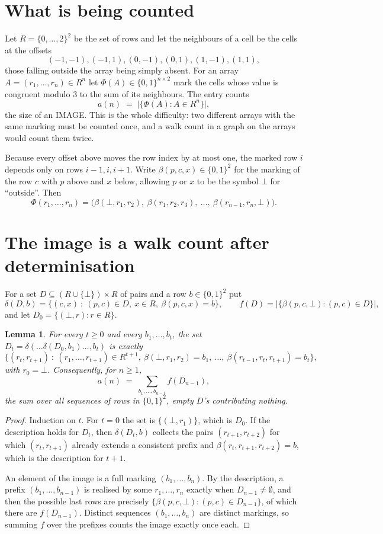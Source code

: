\documentclass[11pt,a4paper]{article}
\theoremstyle{plain}
\newtheorem{lemma}[theorem]{Lemma}
\theoremstyle{definition}
\begin{document}
\section{What is being counted}

Let $R=\{0,\dots,2\}^{2}$ be the set of rows and let the neighbours of a cell be the
cells at the offsets
\[
(-1,-1), (-1,1), (0,-1), (0,1), (1,-1), (1,1),
\]
those falling outside the array being simply absent. For an array
$A=(r_1,\dots,r_n)\in R^n$ let $\Phi(A)\in\{0,1\}^{n\times2}$ mark the cells whose value
is congruent modulo 3 to the sum of its neighbours. The entry counts
\[
a(n)\;=\;\bigl|\{\Phi(A):A\in R^n\}\bigr| ,
\]
the size of an IMAGE. This is the whole difficulty: two different arrays with the same marking
must be counted once, and a walk count in a graph on the arrays would count them twice.

Because every offset above moves the row index by at most one, the marked row $i$ depends only
on rows $i-1,i,i+1$. Write $\beta(p,c,x)\in\{0,1\}^{2}$ for the marking of the row $c$
with $p$ above and $x$ below, allowing $p$ or $x$ to be the symbol $\bot$ for ``outside''.
Then
\[
\Phi(r_1,\dots,r_n)=\bigl(\beta(\bot,r_1,r_2),\ \beta(r_1,r_2,r_3),\ \dots,\
\beta(r_{n-1},r_n,\bot)\bigr).
\]

\section{The image is a walk count after determinisation}

For a set $D\subseteq(R\cup\{\bot\})\times R$ of pairs and a row $b\in\{0,1\}^{2}$ put
\[
\delta(D,b)=\{(c,x)\ :\ (p,c)\in D,\ x\in R,\ \beta(p,c,x)=b\},\qquad
f(D)=\bigl|\{\beta(p,c,\bot):(p,c)\in D\}\bigr| ,
\]
and let $D_0=\{(\bot,r):r\in R\}$.

\begin{lemma}\label{lem:det}
For every $t\ge0$ and every $b_1,\dots,b_t$, the set
$D_t=\delta(\dots\delta(D_0,b_1)\dots,b_t)$ is exactly
\[
\{(r_t,r_{t+1})\ :\ (r_1,\dots,r_{t+1})\in R^{t+1},\ \beta(\bot,r_1,r_2)=b_1,\ \dots,\
\beta(r_{t-1},r_t,r_{t+1})=b_t\} ,
\]
with $r_0=\bot$. Consequently, for $n\ge1$,
\[
a(n)\;=\;\sum_{b_1,\dots,b_{n-1}}f(D_{n-1}),
\]
the sum over all sequences of rows in $\{0,1\}^{2}$, empty $D$'s contributing nothing.
\end{lemma}

\begin{proof}
Induction on $t$. For $t=0$ the set is $\{(\bot,r_1)\}$, which is $D_0$. If the description
holds for $D_t$, then $\delta(D_t,b)$ collects the pairs $(r_{t+1},r_{t+2})$ for which
$(r_t,r_{t+1})$ already extends a consistent prefix and
$\beta(r_t,r_{t+1},r_{t+2})=b$, which is the description for $t+1$.

An element of the image is a full marking $(b_1,\dots,b_n)$. By the description, a prefix
$(b_1,\dots,b_{n-1})$ is realised by some $r_1,\dots,r_n$ exactly when $D_{n-1}\neq
\emptyset$, and then the possible last rows are precisely
$\{\beta(p,c,\bot):(p,c)\in D_{n-1}\}$, of which there are $f(D_{n-1})$. Distinct
sequences $(b_1,\dots,b_n)$ are distinct markings, so summing $f$ over the prefixes counts the
image exactly once each.
\end{proof}
\end{document}
